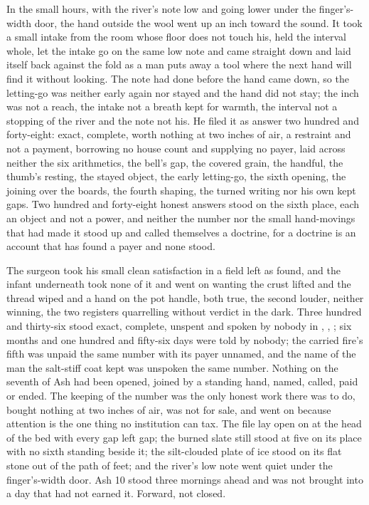 In the small hours, with the river's note low and going lower under the finger's-width door, the hand outside the wool went up an inch toward the sound. It took a small intake from the room whose floor does not touch his, held the interval whole, let the intake go on the same low note and came straight down and laid itself back against the fold as a man puts away a tool where the next hand will find it without looking. The note had done before the hand came down, so the letting-go was neither early again nor stayed and the hand did not stay; the inch was not a reach, the intake not a breath kept for warmth, the interval not a stopping of the river and the note not his. He filed it as answer two hundred and forty-eight: exact, complete, worth nothing at two inches of air, a restraint and not a payment, borrowing no house count and supplying no payer, laid across neither the six arithmetics, the bell's gap, the covered grain, the handful, the thumb's resting, the stayed object, the early letting-go, the sixth opening, the joining over the boards, the fourth shaping, the turned writing nor his own kept gaps. Two hundred and forty-eight honest answers stood on the sixth place, each an object and not a power, and neither the number nor the small hand-movings that had made it stood up and called themselves a doctrine, for a doctrine is an account that has found a payer and none stood.

The surgeon took his small clean satisfaction in a field left as found, and the infant underneath took none of it and went on wanting the crust lifted and the thread wiped and a hand on the pot handle, both true, the second louder, neither winning, the two registers quarrelling without verdict in the dark. Three hundred and thirty-six stood exact, complete, unspent and spoken by nobody in , , ; six months and one hundred and fifty-six days were told by nobody; the carried fire's fifth was unpaid the same number with its payer unnamed, and the name of the man the salt-stiff coat kept was unspoken the same number. Nothing on the seventh of Ash had been opened, joined by a standing hand, named, called, paid or ended. The keeping of the number was the only honest work there was to do, bought nothing at two inches of air, was not for sale, and went on because attention is the one thing no institution can tax. The file lay open on  at the head of the bed with every gap left gap; the burned slate still stood at five on its place with no sixth standing beside it; the silt-clouded plate of ice stood on its flat stone out of the path of feet; and the river's low note went quiet under the finger's-width door. Ash 10 stood three mornings ahead and was not brought into a day that had not earned it. Forward, not closed.
